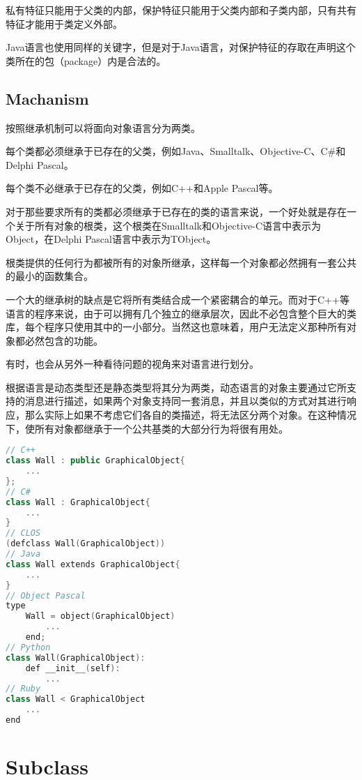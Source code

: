 私有特征只能用于父类的内部，保护特征只能用于父类内部和子类内部，只有共有特征才能用于类定义外部。

Java语言也使用同样的关键字，但是对于Java语言，对保护特征的存取在声明这个类所在的包（package）内是合法的。


\section{Machanism}

按照继承机制可以将面向对象语言分为两类。

\begin{compactitem}
\item 每个类都必须继承于已存在的父类，例如Java、Smalltalk、Objective-C、C\#和Delphi Pascal。
\item 每个类不必继承于已存在的父类，例如C++和Apple Pascal等。
\end{compactitem}

对于那些要求所有的类都必须继承于已存在的类的语言来说，一个好处就是存在一个关于所有对象的根类，这个根类在Smalltalk和Objective-C语言中表示为Object，在Delphi Pascal语言中表示为TObject。

根类提供的任何行为都被所有的对象所继承，这样每一个对象都必然拥有一套公共的最小的函数集合。

一个大的继承树的缺点是它将所有类结合成一个紧密耦合的单元。而对于C++等语言的程序来说，由于可以拥有几个独立的继承层次，因此不必包含整个巨大的类库，每个程序只使用其中的一小部分。当然这也意味着，用户无法定义那种所有对象都必然包含的功能。

有时，也会从另外一种看待问题的视角来对语言进行划分。

根据语言是动态类型还是静态类型将其分为两类，动态语言的对象主要通过它所支持的消息进行描述，如果两个对象支持同一套消息，并且以类似的方式对其进行响应，那么实际上如果不考虑它们各自的类描述，将无法区分两个对象。在这种情况下，使所有对象都继承于一个公共基类的大部分行为将很有用处。

\begin{lstlisting}[language=C++]
// C++
class Wall : public GraphicalObject{
	...
};
// C#
class Wall : GraphicalObject{
	...
}
// CLOS
(defclass Wall(GraphicalObject))
// Java
class Wall extends GraphicalObject{
	...
}
// Object Pascal
type
	Wall = object(GraphicalObject)
		...
	end;
// Python
class Wall(GraphicalObject):
	def __init__(self):
		...
// Ruby
class Wall < GraphicalObject
	...
end
\end{lstlisting}


\chapter{Subclass}

